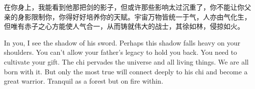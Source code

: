\begin{part}{}{}
    在你身上，我能看到他那把剑的影子，但或许那些影响太过沉重了，你不能让你父亲的身影限制你，你得好好培养你的天赋。宇宙万物皆统一于气，人亦由气化生，但唯有赤子之心方能使人气合一，从而铸就伟大的战士，其徐如林，侵掠如火。

    In you, I see the shadow of his sword. Perhaps this shadow falls heavy on your shoulders. You can't allow your father's legacy to hold you back. You need to cultivate your gift. The chi pervades the universe and all living things. We are all born with it. But only the most true will connect deeply to his chi and become a great warrior. Tranquil as a forest but on fire within.
\end{part}